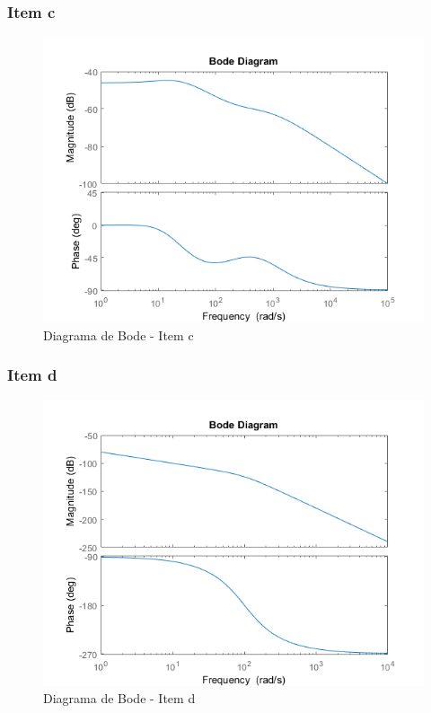 \documentclass[a4paper, 12pt]{article}
\begin{document}
        \subsubsection{Item c}
		\begin{figure}[!ht]
			\centering
			\includegraphics{img/Q7c.png}
			\caption{Diagrama de Bode - Item c}	
		\end{figure}         
		\newpage
        \subsubsection{Item d}
		\begin{figure}[!ht]
			\centering
			\includegraphics{img/Q7d.png}
			\caption{Diagrama de Bode - Item d}	
		\end{figure}          
	\newpage   
\end{document}
